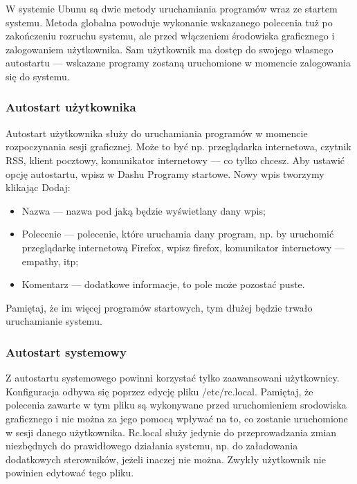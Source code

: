 W systemie Ubunu są dwie metody uruchamiania programów wraz ze startem systemu. Metoda globalna powoduje wykonanie wskazanego polecenia tuż po zakończeniu rozruchu systemu, ale przed włączeniem środowiska graficznego i zalogowaniem użytkownika. Sam użytkownik ma dostęp do swojego własnego autostartu --- wskazane programy zostaną uruchomione w momencie zalogowania się do systemu.

\subsubsection{Autostart użytkownika}
Autostart użytkownika służy do uruchamiania programów w momencie rozpoczynania sesji graficznej. Może to być np. przeglądarka internetowa, czytnik RSS, klient pocztowy, komunikator internetowy --- co tylko chcesz. Aby ustawić opcję autostartu, wpisz w Dashu \textcolor{ubuntu_orange}{Programy startowe}. Nowy wpis tworzymy klikając \textcolor{ubuntu_orange}{Dodaj}:
\begin{itemize}
\item \textcolor{ubuntu_orange}{Nazwa} --- nazwa pod jaką będzie wyświetlany dany wpis;
\item \textcolor{ubuntu_orange}{Polecenie} --- polecenie, które uruchamia dany program, np. by uruchomić przeglądarkę internetową Firefox, wpisz \textcolor{ubuntu_orange}{firefox}, komunikator internetowy --- \textcolor{ubuntu_orange}{empathy}, itp;
\item \textcolor{ubuntu_orange}{Komentarz} --- dodatkowe informacje, to pole może pozostać puste.
\end{itemize}

Pamiętaj, że im więcej programów startowych, tym dłużej będzie trwało uruchamianie systemu.

\subsubsection{Autostart systemowy}
Z autostartu systemowego powinni korzystać tylko zaawansowani użytkownicy. Konfiguracja odbywa się poprzez edycję pliku \textcolor{ubuntu_orange}{/etc/rc.local}. Pamiętaj, że polecenia zawarte w tym pliku są wykonywane przed uruchomieniem srodowiska graficznego i nie można za jego pomocą wpływać na to, co zostanie uruchomione w sesji danego użytkownika. Rc.local służy jedynie do przeprowadzania zmian niezbędnych do prawidłowego działania systemu, np. do załadowania dodatkowych sterowników, jeżeli inaczej nie można. Zwykły użytkownik nie powinien edytować tego pliku.
